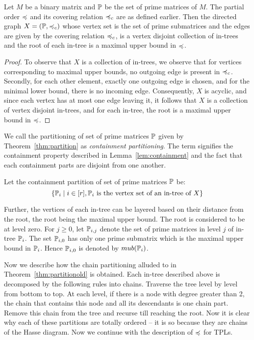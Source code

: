 \begin{theorem}%
  \label{thm:partition} %
  Let $M$ be a binary matrix and $\mathbb P$ be the set of prime matrices of
  $M$. The partial order $\preccurlyeq$ and its covering relation
  $\preccurlyeq_c$ are as defined earlier.
  Then the directed graph $X = (\mathbb P, \preccurlyeq_c)$ whose vertex
  set is the set of prime submatrices and the edges are given
  by the covering relation $\preccurlyeq_c$, is a vertex
  disjoint collection of in-trees and the root of each in-tree is a
  maximal upper bound in $\preccurlyeq$.
\end{theorem}
\begin{proof}\thesisspacing
  To observe that $X$ is a collection of in-trees, we observe that for
  vertices corresponding to maximal upper bounds, no outgoing edge is
  present in $\preccurlyeq_c$.  Secondly, for each other element,
  exactly one outgoing edge is chosen, and for the minimal lower
  bound, there is no incoming edge.  Consequently, $X$ is acyclic, and
  since each vertex has at most one edge leaving it, it follows that
  $X$ is a collection of vertex disjoint in-trees, and for each
  in-tree, the root is a maximal upper bound in $\preccurlyeq$.
\end{proof}


We call the partitioning of set of prime matrices $\mathbb P$ given by
Theorem~\ref{thm:partition} as {\em containment partitioning}. The term
signifies the containment property described in
Lemma~\ref{lem:containment} and the fact that each containment parts
are disjoint from one another.

Let the containment partition of set of prime matrices $\mathbb P$ be: 
\[\{\mathbb P_i \mid i \in [r], \mathbb P_i \text{ is the vertex set of an
  in-tree of } X\}\] 

Further, the vertices of each in-tree can be
layered based on their distance from the root, the root being the
maximal upper bound.  The root is considered
to be at level zero. For $j \geq 0$, let $\mathbb P_{i,j}$ denote the set of
prime matrices in level $j$ of in-tree $\mathbb P_i$. The set $\mathbb P_{i,0}$
has only one prime submatrix which is the maximal upper bound in
$\mathbb P_i$. Hence $\mathbb P_{i,0}$ is denoted by $mub(\mathbb P_i)$.


Now we describe how the chain partitioning alluded to in
Theorem~\ref{thm:partitionold} is obtained. Each in-tree described
above is decomposed by the following rules into chains. Traverse the
tree level by level from bottom to top. At each level, if there is a
node with degree greater than 2, the chain that contains this node and
all its descendants is one chain part. Remove this chain from the tree
and recurse till reaching the root. Now it is clear why each of these
partitions are totally ordered -- it is so because they are chains of
the Hasse diagram. Now we continue with the description of
$\preccurlyeq$ for TPLs. 

